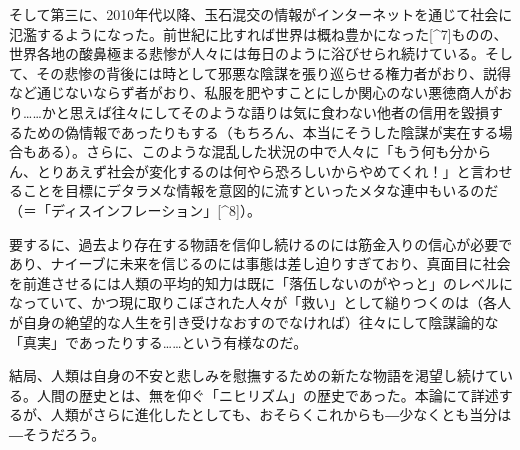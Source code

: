 \documentclass[
]{ltjsarticle}
\begin{document}
そして第三に、2010年代以降、玉石混交の情報がインターネットを通じて社会に氾濫するようになった。前世紀に比すれば世界は概ね豊かになった{[}\^{}7{]}ものの、世界各地の酸鼻極まる悲惨が人々には毎日のように浴びせられ続けている。そして、その悲惨の背後には時として邪悪な陰謀を張り巡らせる権力者がおり、説得など通じないならず者がおり、私服を肥やすことにしか関心のない悪徳商人がおり\ldots\ldots かと思えば往々にしてそのような語りは気に食わない他者の信用を毀損するための偽情報であったりもする（もちろん、本当にそうした陰謀が実在する場合もある）。さらに、このような混乱した状況の中で人々に「もう何も分からん、とりあえず社会が変化するのは何やら恐ろしいからやめてくれ！」と言わせることを目標にデタラメな情報を意図的に流すといったメタな連中もいるのだ（＝「ディスインフレーション」{[}\^{}8{]}）。

要するに、過去より存在する物語を信仰し続けるのには筋金入りの信心が必要であり、ナイーブに未来を信じるのには事態は差し迫りすぎており、真面目に社会を前進させるには人類の平均的知力は既に「落伍しないのがやっと」のレベルになっていて、かつ現に取りこぼされた人々が「救い」として縋りつくのは（各人が自身の絶望的な人生を引き受けなおすのでなければ）往々にして陰謀論的な「真実」であったりする\ldots\ldots という有様なのだ。

結局、人類は自身の不安と悲しみを慰撫するための新たな物語を渇望し続けている。人間の歴史とは、無を仰ぐ「ニヒリズム」の歴史であった。本論にて詳述するが、人類がさらに進化したとしても、おそらくこれからも―少なくとも当分は―そうだろう。
\end{document}
